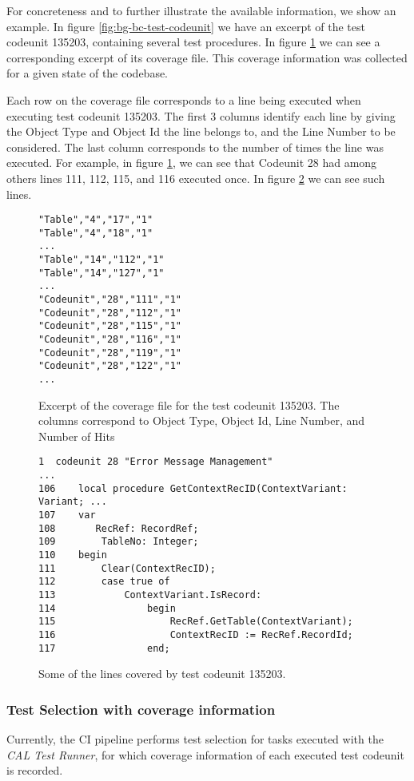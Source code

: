 For concreteness and to further illustrate the available information, we show an example. In figure \ref{fig:bg-bc-test-codeunit}
we have an excerpt of the test codeunit 135203, containing several test procedures. In figure \ref{fig:bg-bc-coveragefile} we can see
a corresponding excerpt of its coverage file. This coverage information was collected for a given state of the codebase.

Each row on the coverage file corresponds to a line being executed when executing test codeunit 135203. The first 3 columns 
identify each line by giving the Object Type and Object Id the line belongs to, and the Line Number to be considered. The last
column corresponds to the number of times the line was executed. For example, in figure \ref{fig:bg-bc-coveragefile},
we can see that Codeunit 28 had among others lines 111, 112, 115, and 116  executed once. In 
figure \ref{fig:bg-bc-covered-file} we can see such lines.

\begin{figure}
    \begin{Verbatim}[fontsize=\tiny]
"Table","4","17","1"
"Table","4","18","1"
...
"Table","14","112","1"
"Table","14","127","1"
...
"Codeunit","28","111","1"
"Codeunit","28","112","1"
"Codeunit","28","115","1"
"Codeunit","28","116","1"
"Codeunit","28","119","1"
"Codeunit","28","122","1"
...
    \end{Verbatim}
    \caption{Excerpt of the coverage file for the test codeunit 135203. The columns correspond to Object Type, Object Id, Line Number, and Number of Hits}
    \label{fig:bg-bc-coveragefile}
\end{figure}

\begin{figure}
    \begin{Verbatim}[fontsize=\tiny]
1  codeunit 28 "Error Message Management"
...
106    local procedure GetContextRecID(ContextVariant: Variant; ...
107    var
108       RecRef: RecordRef;
109        TableNo: Integer;
110    begin
111        Clear(ContextRecID);
112        case true of
113            ContextVariant.IsRecord:
114                begin
115                    RecRef.GetTable(ContextVariant);
116                    ContextRecID := RecRef.RecordId;
117                end;
    \end{Verbatim}
    \caption{Some of the lines covered by test codeunit 135203.}
    \label{fig:bg-bc-covered-file}
\end{figure}

\subsubsection{Test Selection with coverage information}
Currently, the CI pipeline performs test selection for tasks executed with the \emph{CAL Test Runner},
for which coverage information of each executed test codeunit is recorded.

